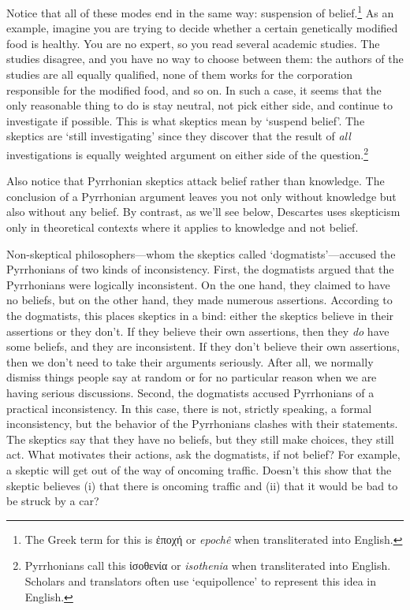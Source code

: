Notice that all of these modes end in the same way: suspension of belief.\footnote{The Greek term for this is \textgreek{ἐποχή} or \textit{epochê} when transliterated into English.} As an example, imagine you are trying to decide whether a certain genetically modified food is healthy. You are no expert, so you read several academic studies. The studies disagree, and you have no way to choose between them: the authors of the studies are all equally qualified, none of them works for the corporation responsible for the modified food, and so on. In such a case, it seems that the only reasonable thing to do is stay neutral, not pick either side, and continue to investigate if possible. This is what skeptics mean by `suspend belief'. The skeptics are `still investigating' since they discover that the result of \textit{all} investigations is equally weighted argument on either side of the question.\footnote{Pyrrhonians call this \textgreek{ἰσοθενία} or \textit{isothenia} when transliterated into English. Scholars and translators often use `equipollence' to represent this idea in English.}

Also notice that Pyrrhonian skeptics attack belief rather than knowledge. The conclusion of a Pyrrhonian argument leaves you not only without knowledge but also without any belief. By contrast, as we'll see below, Descartes uses skepticism only in theoretical contexts where it applies to knowledge and not belief.

Non-skeptical philosophers---whom the skeptics called `dogmatists'---accused the Pyrrhonians of two kinds of inconsistency. First, the dogmatists argued that the Pyrrhonians were logically inconsistent. On the one hand, they claimed to have no beliefs, but on the other hand, they made numerous assertions. According to the dogmatists, this places skeptics in a bind: either the skeptics believe in their assertions or they don't. If they believe their own assertions, then they \textit{do} have some beliefs, and they are inconsistent. If they don't believe their own assertions, then we don't need to take their arguments seriously. After all, we normally dismiss things people say at random or for no particular reason when we are having serious discussions. Second, the dogmatists accused Pyrrhonians of a practical inconsistency. In this case, there is not, strictly speaking, a formal inconsistency, but the behavior of the Pyrrhonians clashes with their statements. The skeptics say that they have no beliefs, but they still make choices, they still act. What motivates their actions, ask the dogmatists, if not belief? For example, a skeptic will get out of the way of oncoming traffic. Doesn't this show that the skeptic believes (i) that there is oncoming traffic and (ii) that it would be bad to be struck by a car?

